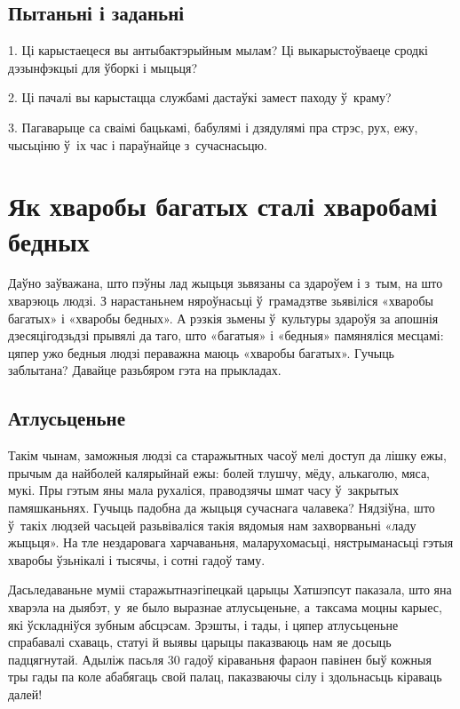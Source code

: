 \subsection*{Пытаньні і заданьні}

1. Ці карыстаецеся вы антыбактэрыйным мылам? Ці выкарыстоўваеце сродкі дэзынфэкцыі для ўборкі і мыцьця?

2. Ці пачалі вы карыстацца службамі дастаўкі замест паходу ў~краму?

3. Пагаварыце са сваімі бацькамі, бабулямі і дзядулямі пра стрэс, рух, ежу, чысьціню ў~іх час і параўнайце з~сучаснасьцю.


\section{Як хваробы багатых сталі хваробамі бедных}

Даўно заўважана, што пэўны лад жыцьця зьвязаны са здароўем і з~тым, на што хварэюць людзі. З нарастаньнем няроўнасьці ў~грамадзтве зьявіліся «хваробы багатых» і «хваробы бедных». А рэзкія зьмены ў~культуры здароўя за апошнія дзесяцігодзьдзі прывялі да таго, што «багатыя» і «бедныя» памяняліся месцамі: цяпер ужо бедныя людзі пераважна маюць «хваробы багатых». Гучыць заблытана? Давайце разьбяром гэта на прыкладах.

\subsection*{Атлусьценьне}

Такім чынам, заможныя людзі са старажытных часоў мелі доступ да лішку ежы, прычым да найболей калярыйнай ежы: болей тлушчу, мёду, алькаголю, мяса, мукі. Пры гэтым яны мала рухаліся, праводзячы шмат часу ў~закрытых памяшканьнях. Гучыць падобна да жыцьця сучаснага чалавека? Нядзіўна, што ў~такіх людзей часьцей разьвіваліся такія вядомыя нам захворваньні «ладу жыцьця». На тле нездаровага харчаваньня, маларухомасьці, нястрыманасьці гэтыя хваробы ўзьнікалі і тысячы, і сотні гадоў таму.

Дасьледаваньне муміі старажытнаэгіпецкай царыцы Хатшэпсут паказала, што яна хварэла на дыябэт, у~яе было выразнае атлусьценьне, а~таксама моцны карыес, які ўскладніўся зубным абсцэсам. Зрэшты, і тады, і цяпер атлусьценьне спрабавалі схаваць, статуі й выявы царыцы паказваюць нам яе досыць падцягнутай. Адыліж пасьля 30 гадоў кіраваньня фараон павінен быў кожныя тры гады па коле абабягаць свой палац, паказваючы сілу і здольнасьць кіраваць далей!

